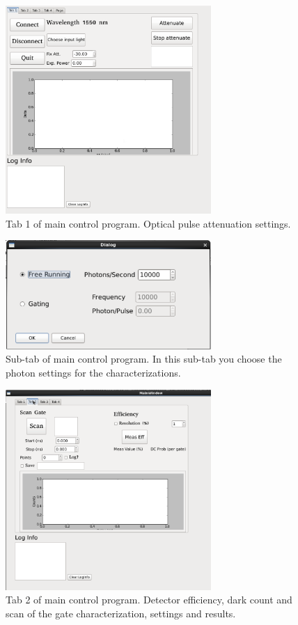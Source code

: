 \documentclass{article}
\begin{document}
\begin{figure}
\centering
\includegraphics[width=7.8cm]{images/tab1.png}
\caption{Tab 1 of main control program. Optical pulse attenuation settings.}
\label{tab1}
\end{figure}

\begin{figure}
\centering
\includegraphics[width=7.8cm]{images/subtab.png}
\caption{Sub-tab of main control program. In this sub-tab you choose the photon settings for the characterizations.}
\label{sub-tab}
\end{figure}

\begin{figure}
\centering
\includegraphics[width=7.8cm]{images/tab2.png}
\caption{Tab 2 of main control program. Detector efficiency, dark count and scan of the gate characterization, settings and results.}
\label{tab2}
\end{figure}
\end{document}

